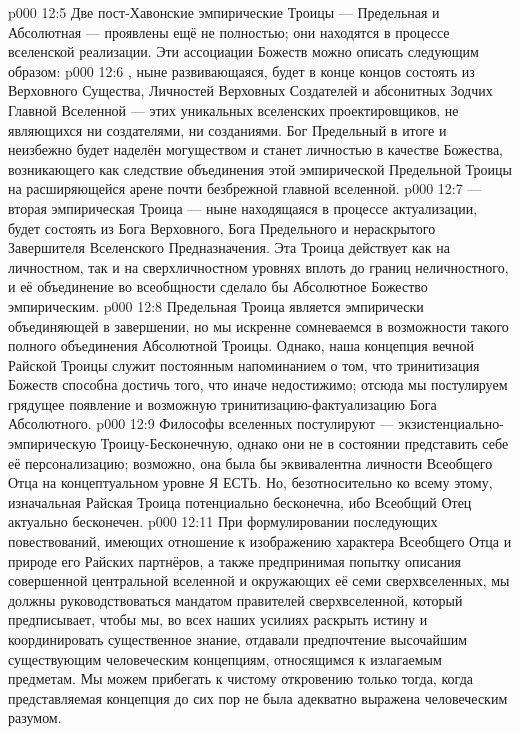 \vs p000 12:5 \pc Две пост\hyp{}Хавонские эмпирические Троицы --- Предельная и Абсолютная --- проявлены ещё не полностью; они находятся в процессе вселенской реализации. Эти ассоциации Божеств можно описать следующим образом:
\vs p000 12:6 , ныне развивающаяся, будет в конце концов состоять из Верховного Существа, Личностей Верховных Создателей и абсонитных Зодчих Главной Вселенной --- этих уникальных вселенских проектировщиков, не являющихся ни создателями, ни созданиями. Бог Предельный в итоге и неизбежно будет наделён могуществом и станет личностью в качестве Божества, возникающего как следствие объединения этой эмпирической Предельной Троицы на расширяющейся арене почти безбрежной главной вселенной.
\vs p000 12:7  --- вторая эмпирическая Троица --- ныне находящаяся в процессе актуализации, будет состоять из Бога Верховного, Бога Предельного и нераскрытого Завершителя Вселенского Предназначения. Эта Троица действует как на личностном, так и на сверхличностном уровнях вплоть до границ неличностного, и её объединение во всеобщности сделало бы Абсолютное Божество эмпирическим.
\vs p000 12:8 \pc Предельная Троица является эмпирически объединяющей в завершении, но мы искренне сомневаемся в возможности такого полного объединения Абсолютной Троицы. Однако, наша концепция вечной Райской Троицы служит постоянным напоминанием о том, что тринитизация Божеств способна достичь того, что иначе недостижимо; отсюда мы постулируем грядущее появление  и возможную тринитизацию\hyp{}фактуализацию Бога Абсолютного.
\vs p000 12:9 \pc Философы вселенных постулируют  --- экзистенциально\hyp{}эмпирическую Троицу\hyp{}Бесконечную, однако они не в состоянии представить себе её персонализацию; возможно, она была бы эквивалентна личности Всеобщего Отца на концептуальном уровне Я ЕСТЬ. Но, безотносительно ко всему этому, изначальная Райская Троица потенциально бесконечна, ибо Всеобщий Отец актуально бесконечен.
\vs p000 12:11 При формулировании последующих повествований, имеющих отношение к изображению характера Всеобщего Отца и природе его Райских партнёров, а также предпринимая попытку описания совершенной центральной вселенной и окружающих её семи сверхвселенных, мы должны руководствоваться мандатом правителей сверхвселенной, который предписывает, чтобы мы, во всех наших усилиях раскрыть истину и координировать существенное знание, отдавали предпочтение высочайшим существующим человеческим концепциям, относящимся к излагаемым предметам. Мы можем прибегать к чистому откровению только тогда, когда представляемая концепция до сих пор не была адекватно выражена человеческим разумом.
